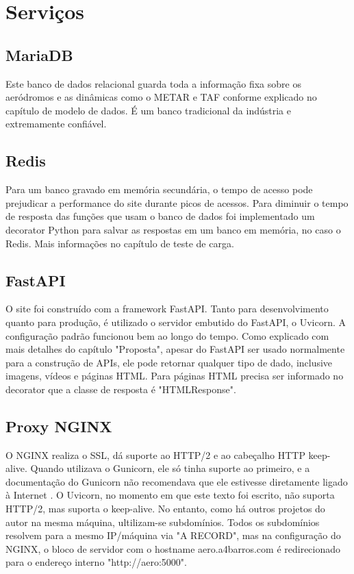 \section{Serviços}

\subsection{MariaDB}
Este banco de dados relacional guarda toda a informação fixa sobre os aeródromos e as dinâmicas
como o METAR e TAF conforme explicado no capítulo de modelo de dados. É um banco tradicional
da indústria e extremamente confiável.

\subsection{Redis}
Para um banco gravado em memória secundária, o tempo de acesso pode prejudicar a 
performance do site durante picos de acessos. Para diminuir o tempo de resposta das
funções que usam o banco
de dados foi implementado um decorator Python para salvar as respostas em um banco
em memória, no caso o Redis. Mais informações no capítulo de teste de carga.

\subsection{FastAPI}

O site foi construído com a framework FastAPI. Tanto para desenvolvimento quanto para produção, 
é utilizado o servidor embutido do FastAPI, o Uvicorn. A configuração padrão funcionou bem ao
longo do tempo. Como explicado com mais detalhes do capítulo "Proposta", apesar do FastAPI ser
usado normalmente para a construção de APIs, ele pode retornar qualquer tipo de dado, inclusive
imagens, vídeos e páginas HTML. Para páginas HTML precisa ser informado no decorator que a
classe de resposta é "HTMLResponse".



\subsection{Proxy NGINX}
O NGINX realiza o SSL, dá suporte ao HTTP/2 e ao cabeçalho HTTP keep-alive. Quando
utilizava o Gunicorn, ele só tinha suporte ao primeiro, e a documentação do Gunicorn não
recomendava que ele estivesse diretamente ligado à Internet \cite{nginx-gunicorn}. O Uvicorn,
no momento em que este texto foi escrito, não suporta HTTP/2, mas suporta o keep-alive. No
entanto, como há outros projetos do autor na mesma máquina, ultilizam-se subdomínios. Todos os subdomínios
resolvem para a mesmo IP/máquina via "A RECORD", mas na configuração
do NGINX, o bloco de servidor com o hostname aero.a4barros.com é redirecionado para o
endereço interno "http://aero:5000".




